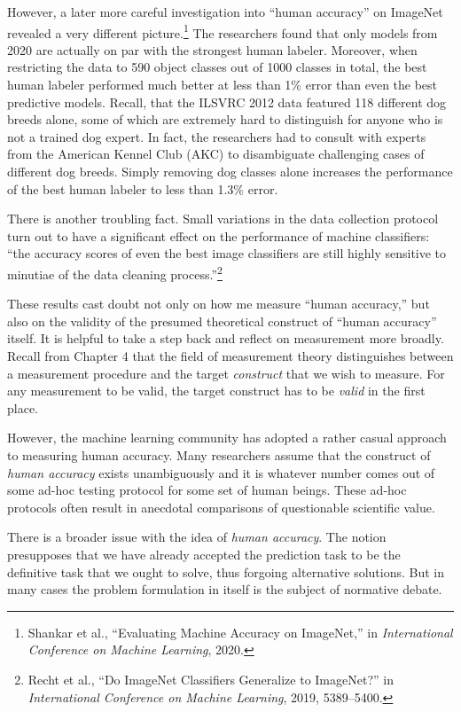 \documentclass{tufte-book}
\begin{document}
However, a later more careful investigation into ``human accuracy'' on
ImageNet revealed a very different picture.\footnote{Shankar et al.,
  {``Evaluating Machine Accuracy on ImageNet,''} in \emph{International
  Conference on Machine Learning}, 2020.} The researchers found that
only models from 2020 are actually on par with the strongest human
labeler. Moreover, when restricting the data to 590 object classes out
of 1000 classes in total, the best human labeler performed much better
at less than 1\% error than even the best predictive models. Recall,
that the ILSVRC 2012 data featured 118 different dog breeds alone, some
of which are extremely hard to distinguish for anyone who is not a
trained dog expert. In fact, the researchers had to consult with experts
from the American Kennel Club (AKC) to disambiguate challenging cases of
different dog breeds. Simply removing dog classes alone increases the
performance of the best human labeler to less than 1.3\% error.

There is another troubling fact. Small variations in the data collection
protocol turn out to have a significant effect on the performance of
machine classifiers: ``the accuracy scores of even the best image
classifiers are still highly sensitive to minutiae of the data cleaning
process.''\footnote{Recht et al., {``Do ImageNet Classifiers Generalize
  to ImageNet?''} in \emph{International Conference on Machine
  Learning}, 2019, 5389--5400.}

These results cast doubt not only on how me measure ``human accuracy,''
but also on the validity of the presumed theoretical construct of
``human accuracy'' itself. It is helpful to take a step back and reflect
on measurement more broadly. Recall from Chapter 4 that the field of
measurement theory distinguishes between a measurement procedure and the
target \emph{construct} that we wish to measure. For any measurement to
be valid, the target construct has to be \emph{valid} in the first
place.

However, the machine learning community has adopted a rather casual
approach to measuring human accuracy. Many researchers assume that the
construct of \emph{human accuracy} exists unambiguously and it is
whatever number comes out of some ad-hoc testing protocol for some set
of human beings. These ad-hoc protocols often result in anecdotal
comparisons of questionable scientific value.

There is a broader issue with the idea of \emph{human accuracy}. The
notion presupposes that we have already accepted the prediction task to
be the definitive task that we ought to solve, thus forgoing alternative
solutions. But in many cases the problem formulation in itself is the
subject of normative debate.
\end{document}
